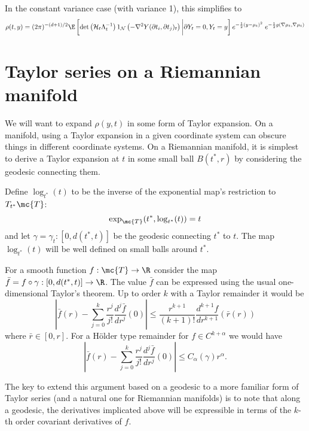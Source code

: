 \documentclass{article}
\begin{document}
In the constant variance case (with variance 1), this simplifies to
$$
\begin{aligned}
\rho(t,y) = (2\pi)^{-(d+1)/2}  \E \left[\det\left({\cal H}_t\Lambda_t^{-1}\right) 1_{{\cal N}}\left(-\nabla^2 Y(\partial t_i, \partial t_j)_t \right) \biggl \vert \partial Y_t=0, Y_t=y\right] e^{-\frac{1}{2}(y-\mu_t)^2} \; e^{-\frac{1}{2}g(\nabla \mu_t,\nabla \mu_t)}
\end{aligned}
$$

\section{Taylor series on a Riemannian manifold}


We will want to expand $\rho(y,t)$ in some form of Taylor
expansion. On a manifold, using a Taylor expansion in a given
coordinate system can obscure things in different coordinate
systems. On a Riemannian manifold, it is simplest to derive a Taylor expansion
at $t$ in some small ball $B(t^*,r)$ by considering the geodesic connecting them.

Define $\log_{t^*}(t)$ to be the inverse of the exponential map's restriction to $T_{t^*}\mc{T}$:
$$
\exp_{\mc{T}}(t^*, \log_{t^*}(t)) = t
$$
and let $\gamma = \gamma_t:[0, d(t^*,t)]$ be the geodesic connecting $t^*$ to $t$. The map $\log_{t^*}(t)$ will be well defined
on small balls around $t^*$.

For a smooth function $f:\mc{T} \rightarrow \R$ consider the map $\bar{f} = f \circ \gamma: [0, d(t^*,t)] \rightarrow \R$.
The value $\bar{f}$ can be expressed using the usual one-dimensional Taylor's theorem. Up to order $k$ with a Taylor remainder it would be
$$
 \left|\bar{f}(r) - \sum_{j=0}^k \frac{r^j}{j!} \frac{d^j\bar{f}}{dr^j}(0) \right| \leq  \frac{r^{k+1}}{(k+1)!}\frac{d^{k+1}f}{dr^{k+1}} (\bar{r}(r))
$$
where $\bar{r} \in [0, r]$. For a H\"older type remainder for $f \in C^{k+\alpha}$ we would have
$$
 \left|\bar{f}(r) - \sum_{j=0}^k \frac{r^j}{j!} \frac{d^j\bar{f}}{dr^j}(0) \right| \leq  C_{\alpha}(\gamma) r^{\alpha}.
$$

 The key to extend this argument based on a geodesic to a more familiar form of Taylor series (and a natural one for Riemannian manifolds)
 is to note that along a geodesic, the derivatives implicated above will be expressible in terms of the $k$-th order covariant
 derivatives of $f$.
\end{document}
